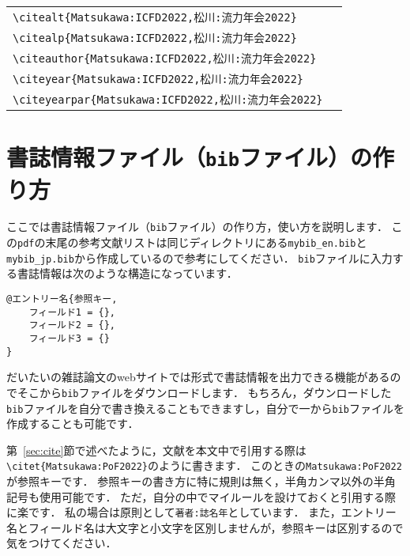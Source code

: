 \documentclass[a4paper,fleqn,uplatex,dvipdfmx]{jsarticle}
\begin{document}
\begin{table}[t]
\begin{tabular}{ll}
        \verb|\citealt{Matsukawa:ICFD2022,松川:流力年会2022}|         &\citealt{Matsukawa:ICFD2022,松川:流力年会2022} \\
        \verb|\citealp{Matsukawa:ICFD2022,松川:流力年会2022}|         &\citealp{Matsukawa:ICFD2022,松川:流力年会2022} \\
        \verb|\citeauthor{Matsukawa:ICFD2022,松川:流力年会2022}|      &\citeauthor{Matsukawa:ICFD2022,松川:流力年会2022} \\
        \verb|\citeyear{Matsukawa:ICFD2022,松川:流力年会2022}|        &\citeyear{Matsukawa:ICFD2022,松川:流力年会2022} \\
        \verb|\citeyearpar{Matsukawa:ICFD2022,松川:流力年会2022}|     &\citeyearpar{Matsukawa:ICFD2022,松川:流力年会2022}
    \end{tabular}
\end{table}


\clearpage
\section{書誌情報ファイル（\texttt{bib}ファイル）の作り方}
\label{sec:bib}
ここでは書誌情報ファイル（\texttt{bib}ファイル）の作り方，使い方を説明します．
この\verb|pdf|の末尾の参考文献リストは同じディレクトリにある\verb|mybib_en.bib|と\verb|mybib_jp.bib|から作成しているので参考にしてください．
\verb|bib|ファイルに入力する書誌情報は次のような構造になっています．
\begin{tcolorbox}[enhanced, title=\textgt{\texttt{bib}ファイル内の書誌情報の構造}]
\begin{verbatim}
@エントリー名{参照キー,
    フィールド1 = {},
    フィールド2 = {},
    フィールド3 = {}
}
\end{verbatim}
\end{tcolorbox}
\noindent
だいたいの雑誌論文のwebサイトでは\BibTeX{}形式で書誌情報を出力できる機能があるのでそこから\verb|bib|ファイルをダウンロードします．
もちろん，ダウンロードした\verb|bib|ファイルを自分で書き換えることもできますし，自分で一から\verb|bib|ファイルを作成することも可能です．

第~\ref{sec:cite}節で述べたように，文献を本文中で引用する際は\verb|\citet{Matsukawa:PoF2022}|のように書きます．
このときの\verb|Matsukawa:PoF2022|が参照キーです．
参照キーの書き方に特に規則は無く，半角カンマ以外の半角記号も使用可能です．
ただ，自分の中でマイルールを設けておくと引用する際に楽です．
私の場合は原則として\texttt{\colorbox[gray]{0.8}{著者}:\colorbox[gray]{0.8}{誌名}\colorbox[gray]{0.8}{年}}としています．
また，エントリー名とフィールド名は大文字と小文字を区別しませんが，参照キーは区別するので気をつけてください．
\end{document}
